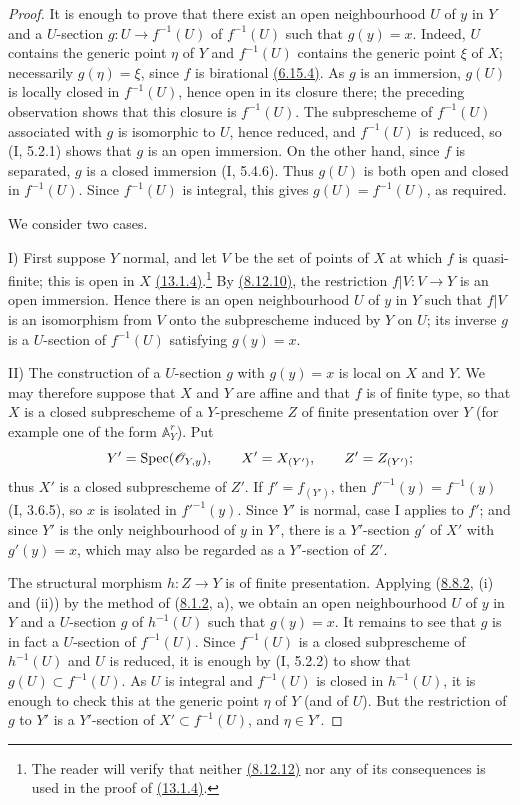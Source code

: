 \begin{proof}
It is enough to prove that there exist an open neighbourhood $U$ of
$y$ in $Y$ and a $U$-section $g:U\to f^{-1}(U)$ of $f^{-1}(U)$ such
that $g(y)=x$.  Indeed, $U$ contains the generic point $\eta$ of $Y$
and $f^{-1}(U)$ contains the generic point $\xi$ of $X$; necessarily
$g(\eta)=\xi$, since $f$ is birational {\hyperref[IV.6.15.4]{(6.15.4)}}.  As $g$ is an
immersion, $g(U)$ is locally closed in $f^{-1}(U)$, hence open in its
closure there; the preceding observation shows that this closure is
$f^{-1}(U)$.  The subprescheme of $f^{-1}(U)$ associated with $g$ is
isomorphic to $U$, hence reduced, and $f^{-1}(U)$ is reduced, so (I,
5.2.1) shows that $g$ is an open immersion.  On the other hand, since
$f$ is separated, $g$ is a closed immersion (I, 5.4.6).  Thus $g(U)$
is both open and closed in $f^{-1}(U)$.  Since $f^{-1}(U)$ is integral,
this gives $g(U)=f^{-1}(U)$, as required.

We consider two cases.

\textup{I)} First suppose $Y$ normal, and let $V$ be the set of points
of $X$ at which $f$ is quasi-finite; this is open in $X$ {\hyperref[IV.13.1.4]{(13.1.4)}}.\footnote{The
reader will verify that neither {\hyperref[IV.8.12.12]{(8.12.12)}} nor any of its consequences is
used in the proof of {\hyperref[IV.13.1.4]{(13.1.4)}}.}  By {\hyperref[IV.8.12.10]{(8.12.10)}},
the restriction
$f|V:V\to Y$ is an open immersion.  Hence there is an open
neighbourhood $U$ of $y$ in $Y$ such that $f|V$ is an isomorphism from
$V$ onto the subprescheme induced by $Y$ on $U$; its inverse $g$ is a
$U$-section of $f^{-1}(U)$ satisfying $g(y)=x$.

\textup{II)} The construction of a $U$-section $g$ with $g(y)=x$ is
local on $X$ and $Y$.  We may therefore suppose that $X$ and $Y$ are
affine and that $f$ is of finite type, so that $X$ is a closed
subprescheme of a $Y$-prescheme $Z$ of finite presentation over $Y$
(for example one of the form $\mathbb A_Y^r$).  Put
\[
 Y'=\operatorname{Spec}(\mathscr{O}_{Y,y}),\qquad
 X'=X_{(Y')},\qquad Z'=Z_{(Y')};
\]
thus $X'$ is a closed subprescheme of $Z'$.  If $f'=f_{(Y')}$, then
$f'^{-1}(y)=f^{-1}(y)$ (I, 3.6.5), so $x$ is isolated in
$f'^{-1}(y)$.  Since $Y'$ is normal, case I applies to $f'$; and since
$Y'$ is the only neighbourhood of $y$ in $Y'$, there is a $Y'$-section
$g'$ of $X'$ with $g'(y)=x$, which may also be regarded as a
$Y'$-section of $Z'$.

The structural morphism $h:Z\to Y$ is of finite presentation.  Applying
({\hyperref[IV.8.8.2]{8.8.2}}, (i) and (ii)) by the method of ({\hyperref[IV.8.1.2]{8.1.2}}, a), we obtain an open
neighbourhood $U$ of $y$ in $Y$ and a $U$-section $g$ of $h^{-1}(U)$
such that $g(y)=x$.  It remains to see that $g$ is in fact a $U$-section
of $f^{-1}(U)$.  Since $f^{-1}(U)$ is a closed subprescheme of
$h^{-1}(U)$ and $U$ is reduced, it is enough by (I, 5.2.2) to show that
$g(U)\subset f^{-1}(U)$.  As $U$ is integral and $f^{-1}(U)$ is closed
in $h^{-1}(U)$, it is enough to check this at the generic point $\eta$
of $Y$ (and of $U$).  But the restriction of $g$ to $Y'$ is a
$Y'$-section of $X'\subset f^{-1}(U)$, and $\eta\in Y'$.
\end{proof}

